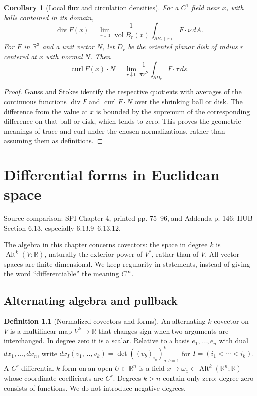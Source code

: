 \documentclass[11pt,oneside,openany]{book}
\newtheorem{corollary}[theorem]{Corollary}
\theoremstyle{definition}
\newtheorem{definition}[theorem]{Definition}
\theoremstyle{remark}
\newcommand{\R}{\mathbb R}
\DeclareMathOperator{\Alt}{Alt}
\DeclareMathOperator{\vol}{vol}
\newcommand{\family}[1]{}
\newcommand{\source}[1]{\par\begingroup\small\sffamily\color{black!65}Source comparison: #1\par\endgroup}
\begin{document}
\begin{corollary}[Local flux and circulation densities]\label{d04:12:local-meaning}
For a $C^1$ field near $x$, with balls contained in its domain,
\[
 \operatorname{div}F(x)=\lim_{r\downarrow0}
 \frac1{\vol B_r(x)}\int_{\partial B_r(x)}F\cdot\nu\,dA.
\]
For $F$ in $\R^3$ and a unit vector $N$, let $D_r$ be the oriented planar
disk of radius $r$ centered at $x$ with normal $N$. Then
\[
 \operatorname{curl}F(x)\cdot N
 =\lim_{r\downarrow0}\frac1{\pi r^2}
       \int_{\partial D_r}F\cdot\tau\,ds.
\]
\end{corollary}
\begin{proof}
Gauss and Stokes identify the respective quotients with averages of the
continuous functions $\operatorname{div}F$ and
$\operatorname{curl}F\cdot N$ over the shrinking ball or disk. The
difference from the value at $x$ is bounded by the supremum of the
corresponding difference on that ball or disk, which tends to zero.
This proves the geometric meanings of trace and curl under the chosen
normalizations, rather than assuming them as definitions.
\end{proof}



\chapter{Differential forms in Euclidean space}
\label{ch:d04-13}
\source{SPI Chapter 4, printed pp. 75--96, and Addenda p. 146; HUB Section 6.13, especially 6.13.9--6.13.12.}

The algebra in this chapter concerns covectors: the space in degree $k$ is
$\Alt^k(V;\R)$, naturally the exterior power of $V^*$, rather than of $V$.
All vector spaces are finite dimensional. We keep regularity in statements,
instead of giving the word ``differentiable'' the meaning $C^\infty$.

\section{Alternating algebra and pullback}
\family{K04.13.01}\family{K04.13.02}\family{K04.13.03}
\begin{definition}[Normalized covectors and forms]\label{d04:13:forms}
An alternating $k$-covector on $V$ is a multilinear map $V^k\to\R$ that
changes sign when two arguments are interchanged. In degree zero it is a
scalar. Relative to a basis $e_1,\ldots,e_n$ with dual $dx_1,\ldots,dx_n$,
write $dx_I(v_1,\ldots,v_k)=\det((v_b)_{i_a})_{a,b=1}^k$ for
$I=(i_1<\cdots<i_k)$. A $C^r$ differential $k$-form on an open
$U\subset\R^n$ is a field $x\mapsto\omega_x\in\Alt^k(\R^n;\R)$
whose coordinate coefficients are $C^r$. Degrees $k>n$ contain only zero;
degree zero consists of functions. We do not introduce negative degrees.
\end{definition}
\end{document}
